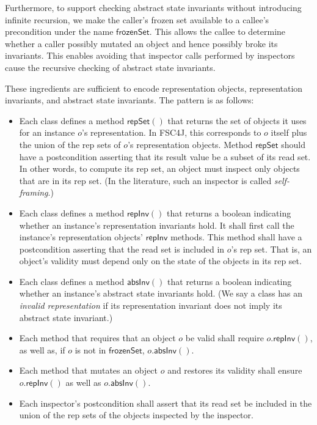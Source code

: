 \documentclass{article}
\begin{document}
Furthermore, to support checking abstract state invariants without introducing infinite recursion, we make the caller's frozen set available to a callee's precondition under the name $\mathsf{frozenSet}$. This allows the callee to determine whether a caller possibly mutated an object and hence possibly broke its invariants. This enables avoiding that inspector calls performed by inspectors cause the recursive checking of abstract state invariants.

These ingredients are sufficient to encode representation objects, representation invariants, and abstract state invariants. The pattern is as follows:
\begin{itemize}
\item Each class defines a method $\mathsf{repSet}()$ that returns the set of objects it uses for an instance $o$'s representation. In FSC4J, this corresponds to $o$ itself plus the union of the rep sets of $o$'s representation objects. Method $\mathsf{repSet}$ should have a postcondition asserting that its result value be a subset of its read set. In other words, to compute its rep set, an object must inspect only objects that are in its rep set. (In the literature, such an inspector is called \emph{self-framing}.)
\item Each class defines a method $\mathsf{repInv}()$ that returns a boolean indicating whether an instance's representation invariants hold. It shall first call the instance's representation objects' $\mathsf{repInv}$ methods. This method shall have a postcondition asserting that the read set is included in $o$'s rep set. That is, an object's validity must depend only on the state of the objects in its rep set.
\item Each class defines a method $\mathsf{absInv}()$ that returns a boolean indicating whether an instance's abstract state invariants hold. (We say a class has an \emph{invalid representation} if its representation invariant does not imply its abstract state invariant.)
\item Each method that requires that an object $o$ be valid shall require $o.\mathsf{repInv}()$, as well as, if $o$ is not in $\mathsf{frozenSet}$, $o.\mathsf{absInv}()$.
\item Each method that mutates an object $o$ and restores its validity shall ensure $o.\mathsf{repInv}()$ as well as $o.\mathsf{absInv}()$.
\item Each inspector's postcondition shall assert that its read set be included in the union of the rep sets of the objects inspected by the inspector.
\end{itemize}
\end{document}
